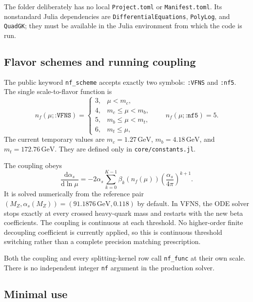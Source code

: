 \documentclass[11pt]{article}
\newcommand{\dd}{\mathrm{d}}
\begin{document}
The folder deliberately has no local \texttt{Project.toml} or
\texttt{Manifest.toml}. Its nonstandard Julia dependencies are
\texttt{DifferentialEquations}, \texttt{PolyLog}, and \texttt{QuadGK}; they
must be available in the Julia environment from which the code is run.

\subsection{Flavor schemes and running coupling}

The public keyword \texttt{nf\_scheme} accepts exactly two symbols:
\texttt{:VFNS} and \texttt{:nf5}. The single scale-to-flavor function is
\begin{equation}
n_f(\mu;\texttt{:VFNS})=
\begin{cases}
3,&\mu<m_c,\\
4,&m_c\le\mu<m_b,\\
5,&m_b\le\mu<m_t,\\
6,&m_t\le\mu,
\end{cases}
\qquad
n_f(\mu;\texttt{:nf5})=5.
\label{eq:nf-schemes}
\end{equation}
The current temporary values are
\(m_c=1.27\,\mathrm{GeV}\),
\(m_b=4.18\,\mathrm{GeV}\), and
\(m_t=172.76\,\mathrm{GeV}\). They are defined only in
\texttt{core/constants.jl}.

The coupling obeys
\begin{equation}
  \frac{\dd\alpha_s}{\dd\ln\mu}
  =
  -2\alpha_s
  \sum_{k=0}^{K-1}
  \beta_k\!\left(n_f(\mu)\right)
  \left(\frac{\alpha_s}{4\pi}\right)^{k+1}.
\label{eq:alpha-running}
\end{equation}
It is solved numerically from the reference pair
\((M_Z,\alpha_s(M_Z))=(91.1876\,\mathrm{GeV},0.118)\) by default. In VFNS,
the ODE solver stops exactly at every crossed heavy-quark mass and restarts
with the new beta coefficients. The coupling is continuous at each threshold.
No higher-order finite decoupling coefficient is currently applied, so this
is continuous threshold switching rather than a complete precision matching
prescription.

Both the coupling and every splitting-kernel row call
\texttt{nf\_func} at their own scale. There is no independent integer
\texttt{nf} argument in the production solver.

\subsection{Minimal use}
\end{document}
